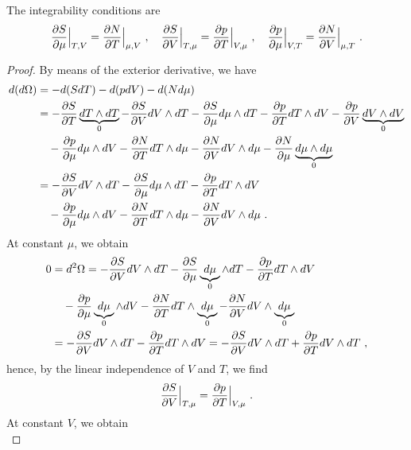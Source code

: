     The integrability conditions are 
    \begin{equation}\label{td:int:o}
        \frac{\partial S}{\partial\mu} \Big \vert_{T,V} = \frac{\partial N}{\partial T} \Big \vert_{\mu,V} ~, \quad 
        \frac{\partial S}{\partial V} \Big \vert_{T,\mu} = \frac{\partial p}{\partial T} \Big \vert_{V, \mu} ~, \quad 
        \frac{\partial p}{\partial\mu} \Big \vert_{V,T} = \frac{\partial N}{\partial V} \Big \vert_{\mu, T} ~. 
    \end{equation}
    \begin{proof}
        By means of the exterior derivative, we have 
        \begin{equation*}
        \begin{aligned}
            d (d\Omega) & = - d (S dT) - d (p dV) - d (N d\mu) \\ & = - \frac{\partial S}{\partial T} \underbrace{dT \wedge dT}_0 - \frac{\partial S}{\partial V} dV \wedge dT - \frac{\partial S}{\partial\mu} d\mu \wedge dT - \frac{\partial p}{\partial T} dT \wedge dV - \frac{\partial p}{\partial V} \underbrace{dV \wedge dV}_0 \\ & \quad - \frac{\partial p}{\partial\mu} d\mu \wedge dV - \frac{\partial N}{\partial T} dT \wedge d\mu - \frac{\partial N}{\partial V} dV \wedge d\mu - \frac{\partial N}{\partial\mu} \underbrace{d\mu \wedge d\mu}_0 \\ & = - \frac{\partial S}{\partial V} dV \wedge dT - \frac{\partial S}{\partial\mu} d\mu \wedge dT - \frac{\partial p}{\partial T} dT \wedge dV \\ & \quad - \frac{\partial p}{\partial\mu} d\mu \wedge dV - \frac{\partial N}{\partial T} dT \wedge d\mu - \frac{\partial N}{\partial V} dV \wedge d\mu ~.
        \end{aligned}
        \end{equation*}
        At constant $\mu$, we obtain
        \begin{equation*}
        \begin{aligned}
            0 & = d^2 \Omega = - \frac{\partial S}{\partial V} dV \wedge dT - \frac{\partial S}{\partial\mu} \underbrace{d\mu}_0 \wedge dT - \frac{\partial p}{\partial T} dT \wedge dV \\ & \quad - \frac{\partial p}{\partial\mu} \underbrace{d\mu}_0 \wedge dV - \frac{\partial N}{\partial T} dT \wedge \underbrace{d\mu}_0 - \frac{\partial N}{\partial V} dV \wedge \underbrace{d\mu}_0 \\ & = - \frac{\partial S}{\partial V} dV \wedge dT - \frac{\partial p}{\partial T} dT \wedge dV = - \frac{\partial S}{\partial V} dV \wedge dT + \frac{\partial p}{\partial T} dV \wedge dT ~,
        \end{aligned}
        \end{equation*}
        hence, by the linear independence of $V$ and $T$, we find
        \begin{equation*}
            \frac{\partial S}{\partial V} \Big \vert_{T,\mu} = \frac{\partial p}{\partial T} \Big \vert_{V, \mu} ~.
        \end{equation*}
        At constant $V$, we obtain
        \begin{equation*}

\end{equation*}
\end{proof}
